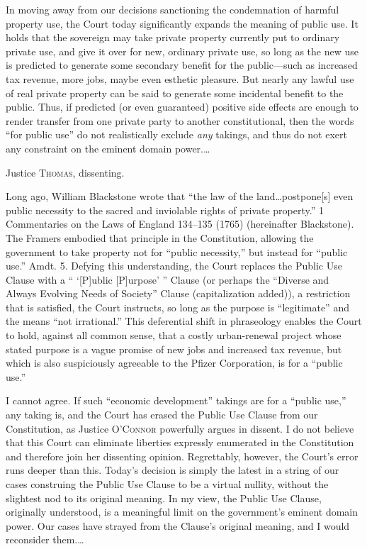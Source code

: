 In moving away from our decisions sanctioning the condemnation of harmful
property use, the Court today significantly expands the meaning of public use.
It holds that the sovereign may take private property currently put to ordinary
private use, and give it over for new, ordinary private use, so long as the new
use is predicted to generate some secondary benefit for the public---such as
increased tax revenue, more jobs, maybe even esthetic pleasure. But nearly any
lawful use of real private property can be said to generate some incidental
benefit to the public. Thus, if predicted (or even guaranteed) positive side
effects are enough to render transfer from one private party to another
constitutional, then the words ``for public use'' do not realistically exclude
\textit{any} takings, and thus do not exert any constraint on the eminent domain
power.\ldots

\opinion Justice \textsc{Thomas}, dissenting.

Long ago, William Blackstone wrote that ``the law of the land\ldots postpone[s]
even public necessity to the sacred and inviolable rights of private property.''
1 Commentaries on the Laws of England 134--135 (1765) (hereinafter Blackstone).
The Framers embodied that principle in the Constitution, allowing the government
to take property not for ``public necessity,'' but instead for ``public use.''
Amdt. 5. Defying this understanding, the Court replaces the Public Use Clause
with a `` `[P]ublic [P]urpose' '' Clause (or perhaps the ``Diverse and Always
Evolving Needs of Society'' Clause (capitalization added)), a restriction that
is satisfied, the Court instructs, so long as the purpose is ``legitimate'' and
the means ``not irrational.'' This deferential shift in phraseology enables the
Court to hold, against all common sense, that a costly urban-renewal project
whose stated purpose is a vague promise of new jobs and increased tax revenue,
but which is also suspiciously agreeable to the Pfizer Corporation, is for a
``public use.''

I cannot agree. If such ``economic development'' takings are for a ``public
use,'' any taking is, and the Court has erased the Public Use Clause from our
Constitution, as Justice \textsc{O'Connor} powerfully argues in dissent. I do
not believe
that this Court can eliminate liberties expressly enumerated in the Constitution
and therefore join her dissenting opinion. Regrettably, however, the Court's
error runs deeper than this. Today's decision is simply the latest in a string
of our cases construing the Public Use Clause to be a virtual nullity, without
the slightest nod to its original meaning. In my view, the Public Use Clause,
originally understood, is a meaningful limit on the government's eminent domain
power. Our cases have strayed from the Clause's original meaning, and I would
reconsider them.\ldots 

